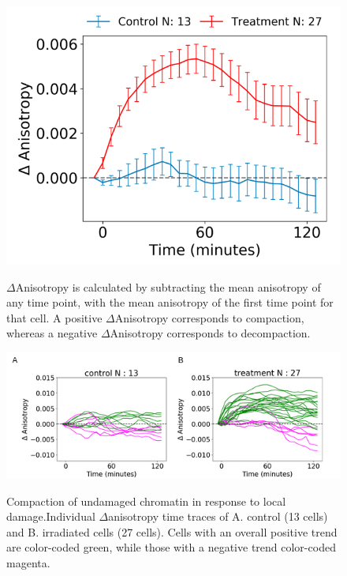 \begin{figure}[H]
    {\hfill\includegraphics[clip, width=0.5\linewidth]{figures/timetrace.png}\hspace*{\fill}}
    \caption{$\Delta$Anisotropy is calculated by subtracting the mean anisotropy of any time point, with the mean anisotropy of the first time point for that cell. A positive $\Delta$Anisotropy corresponds to compaction, whereas a negative $\Delta$Anisotropy corresponds to decompaction.}
    {\label{fig:timetrace}}
\end{figure}


\begin{figure}[!htp]
    {\hfill\includegraphics[clip, width=1\linewidth]{figures/hetero.png}\hspace*{\fill}}
    \caption{Compaction of undamaged chromatin in response to local damage.Individual $\Delta$anisotropy time traces of A. control (13 cells) and B. irradiated cells (27 cells). Cells with an overall positive trend are color-coded green, while those with a negative trend color-coded magenta. }
    {\label{fig:hetero}}
\end{figure}


